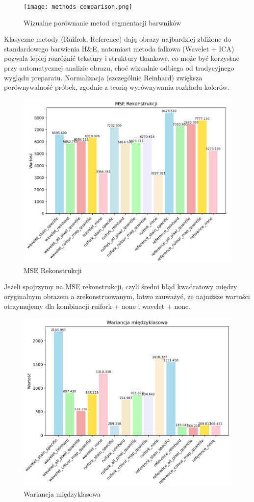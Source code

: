 \documentclass{article}
\begin{document}
\begin{figure}[H]
    \centering
    \texttt{[image: methods\_comparison.png]} %
    \caption{Wizualne porównanie metod segmentacji barwników}
    \label{fig:methods_comparison}
\end{figure}

Klasyczne metody (Ruifrok, Reference) dają obrazy najbardziej zbliżone do standardowego barwienia H\&E, natomiast metoda falkowa (Wavelet + ICA) pozwala lepiej rozróżnić tekstury i struktury tkankowe, co może być korzystne przy automatycznej analizie obrazu, choć wizualnie odbiega od tradycyjnego wyglądu preparatu. Normalizacja (szczególnie Reinhard) zwiększa porównywalność próbek, zgodnie z teorią wyrównywania rozkładu kolorów.

\begin{figure}[H]
    \centering
    \includegraphics[width=0.75\linewidth]{mse.png} %
    \caption{MSE Rekonstrukcji}
    \label{fig:mse}
\end{figure}

Jeżeli spojrzymy na MSE rekonstrukcji, czyli średni błąd kwadratowy między oryginalnym obrazem a zrekonstruowanym, łatwo zauważyć, że najniższe wartości otrzymujemy dla kombinacji ruifork + none i wavelet + none.

\begin{figure}[H]
    \centering
    \includegraphics[width=0.75\linewidth]{wariancja.png} %
    \caption{Wariancja międzyklasowa}
    \label{fig:wariancja}
\end{figure}
\end{document}
